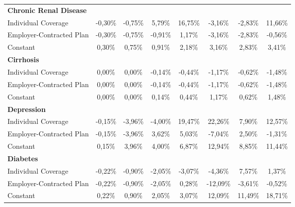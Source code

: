 \documentclass{article}
\begin{document}
\begin{table*}
{\begin{tabular}{l*{7}{c}}
\midrule
\textbf{Chronic Renal Disease}  & & & & & & & \\

Individual Coverage      & -0,30\%\sym{*}  & -0,75\%\sym{**} &  5,79\%         & 16,75\%         & -3,16\%\sym{***}& -2,83\%\sym{**} & 11,66\%         \\
Employer-Contracted Plan & -0,30\%\sym{*}  & -0,75\%\sym{**} & -0,91\%\sym{**} &  1,17\%         & -3,16\%\sym{***}& -2,83\%\sym{**} & -0,56\%         \\
Constant                 &  0,30\%\sym{*}  &  0,75\%\sym{**} &  0,91\%\sym{**} &  2,18\%\sym{***}&  3,16\%\sym{***}&  2,83\%\sym{**} &  3,41\%\sym{**} \\

\midrule
\textbf{Cirrhosis}  & & & & & & & \\

Individual Coverage      &  0,00\%         &  0,00\%         & -0,14\%         & -0,44\%         & -1,17\%\sym{*}  & -0,62\%         & -1,48\%         \\
Employer-Contracted Plan &  0,00\%         &  0,00\%         & -0,14\%         & -0,44\%         & -1,17\%\sym{*}  & -0,62\%         & -1,48\%         \\
Constant                 &  0,00\%         &  0,00\%         &  0,14\%         &  0,44\%         &  1,17\%\sym{*}  &  0,62\%         &  1,48\%         \\

\midrule
\textbf{Depression}  & & & & & & & \\

Individual Coverage      & -0,15\%         & -3,96\%\sym{***}& -4,00\%\sym{***}& 19,47\%         & 22,26\%         &  7,90\%         & 12,57\%         \\
Employer-Contracted Plan & -0,15\%         & -3,96\%\sym{***}&  3,62\%         &  5,03\%         & -7,04\%         &  2,50\%         & -1,31\%         \\
Constant                 &  0,15\%         &  3,96\%\sym{***}&  4,00\%\sym{***}&  6,87\%\sym{***}& 12,94\%\sym{***}&  8,85\%\sym{***}& 11,44\%\sym{***}\\

\midrule
\textbf{Diabetes}  & & & & & & & \\

Individual Coverage      & -0,22\%\sym{*}  & -0,90\%\sym{**} & -2,05\%\sym{***}& -3,07\%\sym{***}& -4,36\%         &  7,57\%         &  1,37\%         \\
Employer-Contracted Plan & -0,22\%\sym{*}  & -0,90\%\sym{**} & -2,05\%\sym{***}&  0,28\%         &-12,09\%\sym{***}& -3,61\%         & -0,52\%         \\
Constant                 &  0,22\%\sym{*}  &  0,90\%\sym{**} &  2,05\%\sym{***}&  3,07\%\sym{***}& 12,09\%\sym{***}& 11,49\%\sym{***}& 18,71\%\sym{***}\\


\end{tabular}}
\end{table*}
\end{document}
